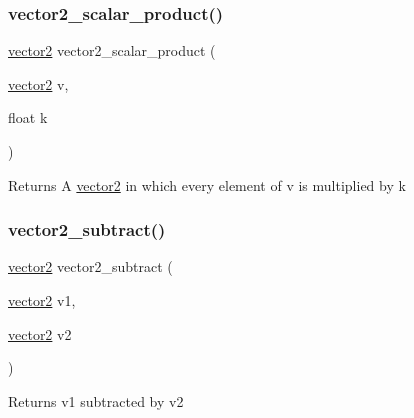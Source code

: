 \subsubsection{\texorpdfstring{vector2\+\_\+scalar\+\_\+product()}{vector2\_scalar\_product()}}
{\footnotesize\ttfamily \hyperlink{structvector2}{vector2} vector2\+\_\+scalar\+\_\+product (\begin{DoxyParamCaption}\item[{\hyperlink{structvector2}{vector2}}]{v,  }\item[{float}]{k }\end{DoxyParamCaption})}

\begin{DoxyReturn}{Returns}
A \hyperlink{structvector2}{vector2} in which every element of v is multiplied by k 
\end{DoxyReturn}
\mbox{\label{group__vector2_ga7a403a2bce25c9ee0fd5e6fc30a8f9ea}} 
\subsubsection{\texorpdfstring{vector2\+\_\+subtract()}{vector2\_subtract()}}
{\footnotesize\ttfamily \hyperlink{structvector2}{vector2} vector2\+\_\+subtract (\begin{DoxyParamCaption}\item[{\hyperlink{structvector2}{vector2}}]{v1,  }\item[{\hyperlink{structvector2}{vector2}}]{v2 }\end{DoxyParamCaption})}

\begin{DoxyReturn}{Returns}
v1 subtracted by v2 
\end{DoxyReturn}
